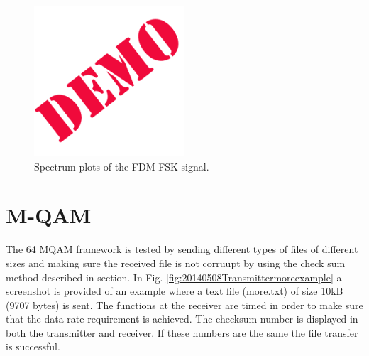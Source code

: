 \documentclass[12pt,a4paper,openright]{report}
\begin{document}
\begin{figure}[H]
  \centering
    \includegraphics[width=0.5\textwidth]{demo.png}
    \caption[Spectrum plots of the FDM-FSK signal.]{Spectrum plots of the FDM-FSK signal. }
    \label{fig:FDMplots}
\end{figure}


\section{M-QAM}

The 64 MQAM framework is tested by sending different types of files of different sizes
and making sure the received file is not corruupt by using the check sum method described in section. In Fig. \ref{fig:20140508Transmittermoreexample} a screenshot
is provided of an example where a text file (more.txt) of size 10kB (9707 bytes) is sent. The functions at the receiver are
timed in order to make sure that the data rate requirement is achieved. The checksum number is displayed in both
the transmitter and receiver. If these numbers are the same the file transfer is successful.
\end{document}

